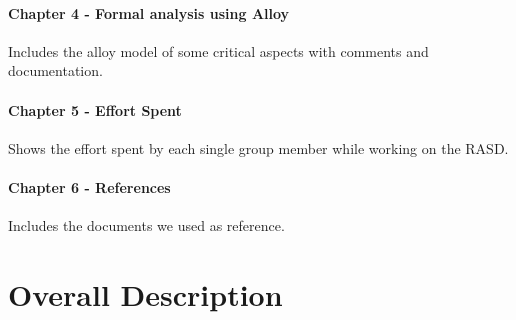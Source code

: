 \documentclass{article}
\begin{document}
\paragraph{Chapter 4 - Formal analysis using Alloy}
Includes the alloy model of some critical aspects with comments and
documentation.
\paragraph{Chapter 5 - Effort Spent}
Shows the effort spent by each single group member while working on the RASD.
\paragraph{Chapter 6 - References}
Includes the documents we used as reference.

\newpage
\section{Overall Description}
\end{document}
